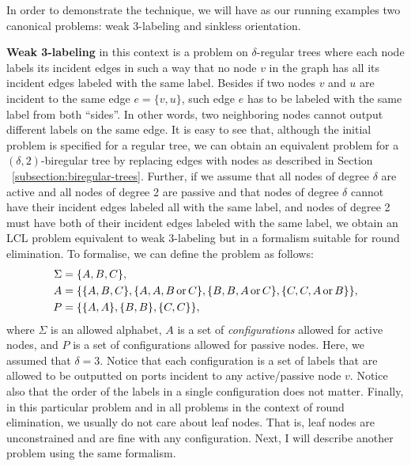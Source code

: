 In order to demonstrate the technique, we will have as our running
examples two canonical problems: weak 3-labeling and sinkless orientation.

\textbf{Weak 3-labeling} in this context is a problem on $\delta$-regular trees where
each node labels its incident edges in such a way that no node $v$ in the graph
has all its incident edges labeled with the same label. Besides if two
nodes $v$ and $u$ are incident to the same edge $e = \{v, u\}$, such
edge $e$ has to be labeled with the same label from both ``sides''. In other words,
two neighboring nodes cannot output different labels on the same edge.
It is easy to see that, although the initial problem is specified for a regular
tree, we can obtain an equivalent problem for a $(\delta, 2)$-biregular tree
by replacing edges with nodes as described in Section ~\ref{subsection:biregular-trees}.
Further, if we assume that all nodes of degree $\delta$ are active and all nodes of 
degree 2 are passive and that nodes of degree $\delta$ cannot have their incident
edges labeled all with the same label, and nodes of degree 2 must have both of their
incident edges labeled with the same label, we obtain an LCL problem equivalent to
weak 3-labeling but in a formalism suitable for round elimination. To formalise, we
can define the problem as follows:
\begin{align*}
\Sigma &= \{A, B, C\}, \\
A &= \{ \{A, B, C\}, \{A, A, B \operatorname{or} C\}, \{B, B, A \operatorname{or} C\}, \{C, C, A \operatorname{or} B\} \}, \\
P &= \{ \{A, A\}, \{B, B\}, \{C, C\}\},
\end{align*}
where $\Sigma$ is an allowed alphabet, $A$ is a set of \emph{configurations}
allowed for active nodes, and $P$ is a set of configurations allowed for
passive nodes. Here, we assumed that $\delta = 3$. Notice that each
configuration is a set of labels that are allowed to be outputted on ports
incident to any active/passive node $v$. Notice also that the order of
the labels in a single configuration does not matter. Finally, in this particular problem
and in all problems in the context of round elimination, we usually do not care about
leaf nodes. That is, leaf nodes are unconstrained and are fine with any 
configuration.  Next, I will
describe another problem using the same formalism.

